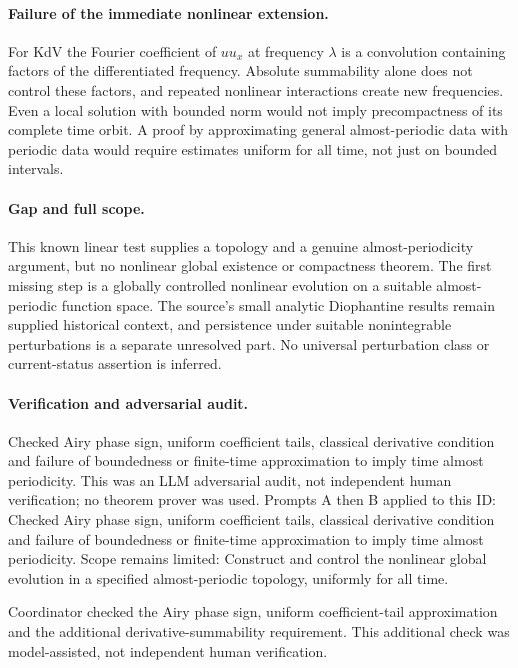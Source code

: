 \documentclass[11pt]{article}
\begin{document}
\paragraph{Failure of the immediate nonlinear extension.}For KdV the Fourier coefficient of \(uu_x\) at frequency \(\lambda\) is a convolution containing factors of the differentiated frequency. Absolute summability alone does not control these factors, and repeated nonlinear interactions create new frequencies. Even a local solution with bounded norm would not imply precompactness of its complete time orbit. A proof by approximating general almost-periodic data with periodic data would require estimates uniform for all time, not just on bounded intervals.
\paragraph{Gap and full scope.}This known linear test supplies a topology and a genuine almost-periodicity argument, but no nonlinear global existence or compactness theorem. The first missing step is a globally controlled nonlinear evolution on a suitable almost-periodic function space. The source's small analytic Diophantine results remain supplied historical context, and persistence under suitable nonintegrable perturbations is a separate unresolved part. No universal perturbation class or current-status assertion is inferred.

\paragraph{Verification and adversarial audit.}
Checked Airy phase sign, uniform coefficient tails, classical derivative condition and failure of boundedness or finite-time approximation to imply time almost periodicity. This was an LLM adversarial audit, not independent human verification; no theorem prover was used. Prompts A then B applied to this ID: Checked Airy phase sign, uniform coefficient tails, classical derivative condition and failure of boundedness or finite-time approximation to imply time almost periodicity. Scope remains limited: Construct and control the nonlinear global evolution in a specified almost-periodic topology, uniformly for all time.

Coordinator checked the Airy phase sign, uniform coefficient-tail approximation and the additional derivative-summability requirement. This additional check was model-assisted, not independent human verification.
\end{document}
